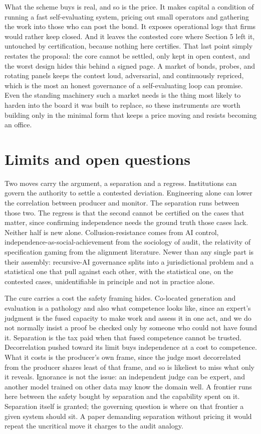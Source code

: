 \documentclass[11pt]{article}
\begin{document}
What the scheme buys is real, and so is the price. It makes capital a condition of running a fast self-evaluating system, pricing out small operators and gathering the work into those who can post the bond. It exposes operational logs that firms would rather keep closed. And it leaves the contested core where Section 5 left it, untouched by certification, because nothing here certifies. That last point simply restates the proposal: the core cannot be settled, only kept in open contest, and the worst design hides this behind a signed page. A market of bonds, probes, and rotating panels keeps the contest loud, adversarial, and continuously repriced, which is the most an honest governance of a self-evaluating loop can promise. Even the standing machinery such a market needs is the thing most likely to harden into the board it was built to replace, so these instruments are worth building only in the minimal form that keeps a price moving and resists becoming an office.

\section{Limits and open questions}

Two moves carry the argument, a separation and a regress. Institutions can govern the authority to settle a contested deviation. Engineering alone can lower the correlation between producer and monitor. The separation runs between those two. The regress is that the second cannot be certified on the cases that matter, since confirming independence needs the ground truth those cases lack. Neither half is new alone. Collusion-resistance comes from AI control, independence-as-social-achievement from the sociology of audit, the relativity of specification gaming from the alignment literature. Newer than any single part is their assembly: recursive-AI governance splits into a jurisdictional problem and a statistical one that pull against each other, with the statistical one, on the contested cases, unidentifiable in principle and not in practice alone.

The cure carries a cost the safety framing hides. Co-located generation and evaluation is a pathology and also what competence looks like, since an expert's judgment is the fused capacity to make work and assess it in one act, and we do not normally insist a proof be checked only by someone who could not have found it. Separation is the tax paid when that fused competence cannot be trusted. Decorrelation pushed toward its limit buys independence at a cost to competence. What it costs is the producer's own frame, since the judge most decorrelated from the producer shares least of that frame, and so is likeliest to miss what only it reveals. Ignorance is not the issue: an independent judge can be expert, and another model trained on other data may know the domain well. A frontier runs here between the safety bought by separation and the capability spent on it. Separation itself is granted; the governing question is where on that frontier a given system should sit. A paper demanding separation without pricing it would repeat the uncritical move it charges to the audit analogy.
\end{document}
